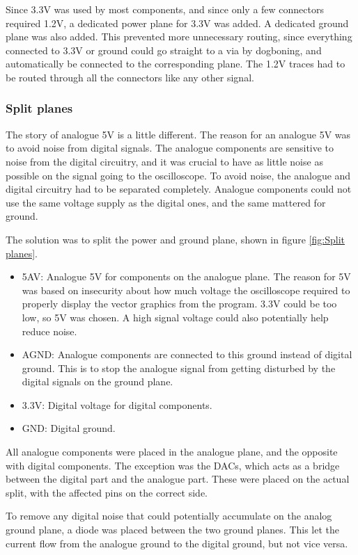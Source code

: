 Since 3.3V was used by most components, and since only a few connectors required 1.2V, a dedicated power plane for 3.3V was added.
A dedicated ground plane was also added.
This prevented more unnecessary routing, since everything connected to 3.3V or ground could go straight to a via by dogboning, and automatically be connected to the corresponding plane. 
The 1.2V traces had to be routed through all the connectors like any other signal. 

\subsubsection{Split planes}
The story of analogue 5V is a little different. 
The reason for an analogue 5V was to avoid noise from digital signals. 
The analogue components are sensitive to noise from the digital circuitry, and it was crucial to have as little noise as possible on the signal going to the oscilloscope. 
To avoid noise, the analogue and digital circuitry had to be separated completely. 
Analogue components could not use the same voltage supply as the digital ones, and the same mattered for ground.

The solution was to split the power and ground plane, shown in figure \ref{fig:Split planes}. 
\begin{itemize}
\item 5AV: Analogue 5V for components on the analogue plane. 
The reason for 5V was based on insecurity about how much voltage the oscilloscope required to properly display the vector graphics from the program. 
3.3V could be too low, so 5V was chosen. 
A high signal voltage could also potentially help reduce noise.
\item AGND: Analogue components are connected to this ground instead of digital ground. 
This is to stop the analogue signal from getting disturbed by the digital signals on the ground plane.
\item 3.3V: Digital voltage for digital components.
\item GND: Digital ground.
\end{itemize}

All analogue components were placed in the analogue plane, and the opposite with digital components. 
The exception was the DACs, which acts as a bridge between the digital part and the analogue part. 
These were placed on the actual split, with the affected pins on the correct side.

To remove any digital noise that could potentially accumulate on the analog ground plane, a diode was placed between the two ground planes. 
This let the current flow from the analogue ground to the digital ground, but not vice versa.

